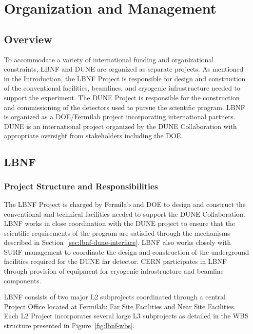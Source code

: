 \chapter{Organization and Management}
\label{v1ch:org-mgmt}

\section{Overview}

To accommodate a variety of international funding and organizational constraints, LBNF and DUNE are organized as separate projects. As mentioned in the Introduction, the LBNF Project is responsible for design and construction of the conventional facilities, beamlines, and cryogenic infrastructure needed to support the experiment.  The DUNE Project is responsible for the construction and commissioning of the detectors used to pursue the scientific program.  LBNF is organized as a DOE/Fermilab project incorporating international partners.   DUNE is an international project organized by the DUNE Collaboration with appropriate oversight from stakeholders including the DOE.

\section{LBNF}

\subsection{Project Structure and Responsibilities}

The LBNF Project is charged by Fermilab and DOE to design and construct the conventional and technical facilities needed to support the DUNE Collaboration. LBNF works in close coordination with the DUNE project to ensure that the scientific requirements of the program are satisfied through the mechanisms described in Section~\ref{sec:lbnf-dune-interface}. LBNF also works closely with SURF management to coordinate the design and construction of the underground facilities required for the DUNE far detector. CERN participates in LBNF through provision of equipment for cryogenic infrastructure and beamline components.
 
LBNF consists of two major L2 subprojects coordinated through a central Project Office located at Fermilab: Far Site Facilities and Near Site Facilities. Each L2 Project incorporates several large L3 subprojects as detailed in the WBS structure presented in Figure~\ref{fig:lbnf-wbs}.
 
